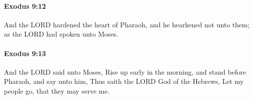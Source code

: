 		\paragraph{Exodus 9:12} %
			\label{EXODUS-9-12}

			And the LORD hardened the heart of Pharaoh, and he hearkened not unto them; as the LORD had spoken unto Moses.


		\paragraph{Exodus 9:13} %
			\label{EXODUS-9-13}

			And the LORD said unto Moses, Rise up early in the morning, and stand before Pharaoh, and say unto him, Thus saith the LORD God of the Hebrews, Let my people go, that they may serve me.


